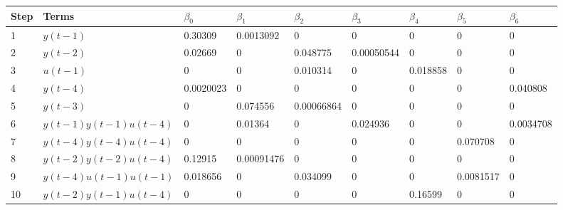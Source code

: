 \begin{tabular}{lllllllll}
Step & Terms & $\beta_{0}$ & $\beta_{1}$ & $\beta_{2}$ & $\beta_{3}$ & $\beta_{4}$ & $\beta_{5}$ & $\beta_{6}$ \\ 
\hline 
1 & $y(t-1)$ & 0.30309 & 0.0013092 & 0 & 0 & 0 & 0 & 0 \\ 
2 & $y(t-2)$ & 0.02669 & 0 & 0.048775 & 0.00050544 & 0 & 0 & 0 \\ 
3 & $u(t-1)$ & 0 & 0 & 0.010314 & 0 & 0.018858 & 0 & 0 \\ 
4 & $y(t-4)$ & 0.0020023 & 0 & 0 & 0 & 0 & 0 & 0.040808 \\ 
5 & $y(t-3)$ & 0 & 0.074556 & 0.00066864 & 0 & 0 & 0 & 0 \\ 
6 & $y(t-1)y(t-1)u(t-4)$ & 0 & 0.01364 & 0 & 0.024936 & 0 & 0 & 0.0034708 \\ 
7 & $y(t-4)y(t-4)u(t-4)$ & 0 & 0 & 0 & 0 & 0 & 0.070708 & 0 \\ 
8 & $y(t-2)y(t-2)u(t-4)$ & 0.12915 & 0.00091476 & 0 & 0 & 0 & 0 & 0 \\ 
9 & $y(t-4)u(t-1)u(t-1)$ & 0.018656 & 0 & 0.034099 & 0 & 0 & 0.0081517 & 0 \\ 
10 & $y(t-2)y(t-1)u(t-4)$ & 0 & 0 & 0 & 0 & 0.16599 & 0 & 0 \\ 
\hline 
\end{tabular}